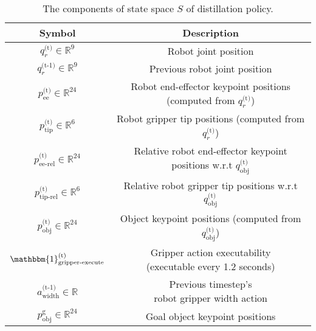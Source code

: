 \begin{table}[h!]
\centering
\begin{adjustbox}{width=\columnwidth}
\setlength\tabcolsep{20 pt}
\begin{tabular}{|c|c|}
\hline
\textbf{Symbol} & \textbf{Description} \\
\hline
$q^\text{(t)}_r \in \mathbb{R}^9$ &Robot joint position  \\
\cline{1-2}
 $q^\text{(t-1)}_r \in \mathbb{R}^9$ & Previous robot joint position  \\
\cline{1-2}
 $p^\text{(t)}_\text{ee} \in \mathbb{R}^{24}$ & \makecell{Robot end-effector keypoint positions \\ (computed from $q^\text{(t)}_r$)} \\
\cline{1-2}
 $p^\text{(t)}_\text{tip} \in \mathbb{R}^6$ & \makecell{Robot gripper tip positions \\ (computed from $q^\text{(t)}_r$)} \\
\hline
$p_\text{ee-rel}^\text{(t)} \in \mathbb{R}^{24}$ & \makecell{Relative robot end-effector \\ keypoint positions w.r.t $q^\text{(t)}_\text{obj}$} \\
\cline{1-2}
 $p^\text{(t)}_\text{tip-rel}\in \mathbb{R}^6$ & \makecell{Relative robot gripper \\ tip positions w.r.t $q^\text{(t)}_\text{obj}$} \\
\hline
  $p^\text{(t)}_\text{obj} \in \mathbb{R}^{24}$ &\makecell{Object keypoint positions \\ (computed from $q^\text{(t)}_\text{obj}$)}  \\
\hline
 $ \mathbbm{1}^\text{(t)}_\text{gripper-execute} $ & \makecell{Gripper action executability \\ (executable every 1.2 seconds)} \\
\hline
 $ a^\text{(t-1)}_\text{width}\in \mathbb{R}$ & \makecell{Previous timestep's \\ robot gripper width action} \\
\hline
$p^\text{g}_\text{obj} \in \mathbb{R}^{24}$ & Goal object keypoint positions \\
\hline
\end{tabular}
\end{adjustbox}
\vspace{-0.2cm}
\begin{flushleft}
\footnotesize
\caption{The components of state space $S$ of distillation policy.}\label{table:IL_state}
\end{flushleft}
\vspace{-1.0cm}
\end{table}
